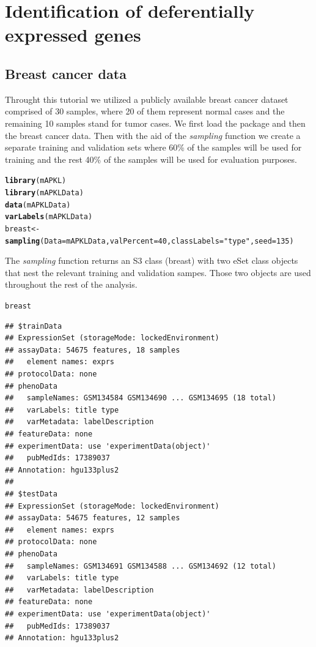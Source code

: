 \documentclass[12pt]{article}\usepackage[]{graphicx}\usepackage[usenames,dvipsnames]{color}
\makeatletter
\newcommand{\hlnum}[1]{\textcolor[rgb]{0.686,0.059,0.569}{#1}}%
\newcommand{\hlstr}[1]{\textcolor[rgb]{0.192,0.494,0.8}{#1}}%
\newcommand{\hlstd}[1]{\textcolor[rgb]{0.345,0.345,0.345}{#1}}%
\newcommand{\hlkwb}[1]{\textcolor[rgb]{0.69,0.353,0.396}{#1}}%
\newcommand{\hlkwc}[1]{\textcolor[rgb]{0.333,0.667,0.333}{#1}}%
\newcommand{\hlkwd}[1]{\textcolor[rgb]{0.737,0.353,0.396}{\textbf{#1}}}%
\newenvironment{kframe}{%
 \def\at@end@of@kframe{}%
 \ifinner\ifhmode%
  \def\at@end@of@kframe{\end{minipage}}%
  \begin{minipage}{\columnwidth}%
 \fi\fi%
 \def\FrameCommand##1{\hskip\@totalleftmargin \hskip-\fboxsep
 \colorbox{shadecolor}{##1}\hskip-\fboxsep
     \hskip-\linewidth \hskip-\@totalleftmargin \hskip\columnwidth}%
 \MakeFramed {\advance\hsize-\width
   \@totalleftmargin\z@ \linewidth\hsize
   \@setminipage}}%
 {\par\unskip\endMakeFramed%
 \at@end@of@kframe}
\newenvironment{knitrout}{}{} %
\makeatother
\begin{document}
\section{Identification of deferentially expressed genes}
\subsection{Breast cancer data}
\noindent Throught this tutorial we utilized a publicly available breast cancer 
dataset comprised of 30 samples, where 20 of them represent normal cases and the 
remaining 10 samples  stand for tumor cases. We first load the package and then 
the breast cancer data. Then with the aid of the \emph{sampling} function we  
create a separate training and validation sets where 60\% of the samples will 
be used for training and the rest 40\% of the samples will 
be used for evaluation purposes.

\begin{knitrout}
\color{fgcolor}\begin{kframe}
\begin{alltt}
\hlkwd{library}\hlstd{(mAPKL)}
\hlkwd{library}\hlstd{(mAPKLData)}
\hlkwd{data}\hlstd{(mAPKLData)}
\hlkwd{varLabels}\hlstd{(mAPKLData)}
\hlstd{breast} \hlkwb{<-} \hlkwd{sampling}\hlstd{(}\hlkwc{Data}\hlstd{=mAPKLData,} \hlkwc{valPercent}\hlstd{=}\hlnum{40}\hlstd{,} \hlkwc{classLabels}\hlstd{=}\hlstr{"type"}\hlstd{,} \hlkwc{seed}\hlstd{=}\hlnum{135}\hlstd{)}
\end{alltt}
\end{kframe}
\end{knitrout}

\noindent The \emph{sampling} function returns an S3 class (breast) with two 
eSet class objects that nest the relevant training and validation sampes. Those 
two objects are used throughout the rest of the analysis.

\begin{knitrout}
\color{fgcolor}\begin{kframe}
\begin{alltt}
\hlstd{breast}
\end{alltt}
\begin{verbatim}
## $trainData
## ExpressionSet (storageMode: lockedEnvironment)
## assayData: 54675 features, 18 samples 
##   element names: exprs 
## protocolData: none
## phenoData
##   sampleNames: GSM134584 GSM134690 ... GSM134695 (18 total)
##   varLabels: title type
##   varMetadata: labelDescription
## featureData: none
## experimentData: use 'experimentData(object)'
##   pubMedIds: 17389037 
## Annotation: hgu133plus2 
## 
## $testData
## ExpressionSet (storageMode: lockedEnvironment)
## assayData: 54675 features, 12 samples 
##   element names: exprs 
## protocolData: none
## phenoData
##   sampleNames: GSM134691 GSM134588 ... GSM134692 (12 total)
##   varLabels: title type
##   varMetadata: labelDescription
## featureData: none
## experimentData: use 'experimentData(object)'
##   pubMedIds: 17389037 
## Annotation: hgu133plus2
\end{verbatim}
\end{kframe}
\end{knitrout}
\end{document}
